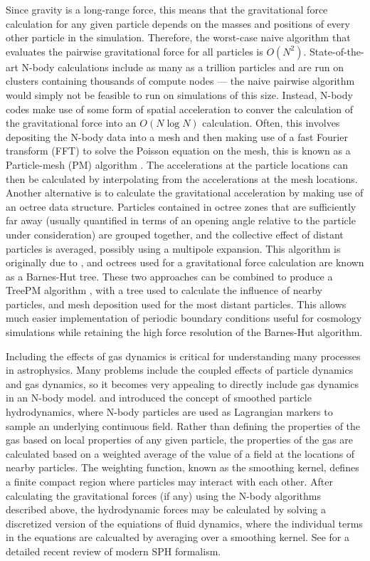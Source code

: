 \documentclass[11pt,twoside]{article}
\begin{document}
Since gravity is a long-range force, this means that the gravitational force calculation for any given particle depends on the masses and positions of every other particle in the simulation. Therefore, the worst-case naive algorithm that evaluates the pairwise gravitational force for all particles is $O(N^2)$. State-of-the-art N-body calculations include as many as a trillion particles and are run on clusters containing thousands of compute nodes --- the naive pairwise algorithm would simply not be feasible to run on simulations of this size. Instead, N-body codes make use of some form of spatial acceleration to conver the calculation of the gravitational force into an $O(N \log N)$ calculation. Often, this involves depositing the N-body data into a mesh and then making use of a fast Fourier transform (FFT) to solve the Poisson equation on the mesh, this is known as a Particle-mesh (PM) algorithm \citep{hockney1988}. The accelerations at the particle locations can then be calculated by interpolating from the accelerations at the mesh locations. Another alternative is to calculate the gravitational acceleration by making use of an octree data structure. Particles contained in octree zones that are sufficiently far away (usually quantified in terms of an opening angle relative to the particle under consideration) are grouped together, and the collective effect of distant particles is averaged, possibly using a multipole expansion. This algorithm is originally due to \citet{barnes1986}, and octrees used for a gravitational force calculation are known as a Barnes-Hut tree. These two approaches can be combined to produce a TreePM algorithm \citep{bagla2002}, with a tree used to calculate the influence of nearby particles, and mesh deposition used for the most distant particles. This allows much easier implementation of periodic boundary conditions useful for cosmology simulations while retaining the high force resolution of the Barnes-Hut algorithm.

Including the effects of gas dynamics is critical for understanding many processes in astrophysics. Many problems include the coupled effects of particle dynamics and gas dynamics, so it becomes very appealing to directly include gas dynamics in an N-body model. \citet{lucy1977} and \citet{gingold1977} introduced the concept of smoothed particle hydrodynamics, where N-body particles are used as Lagrangian markers to sample an underlying continuous field. Rather than defining the properties of the gas based on local properties of any given particle, the properties of the gas are calculated based on a weighted average of the value of a field at the locations of nearby particles. The weighting function, known as the smoothing kernel, defines a finite compact region where particles may interact with each other. After calculating the gravitational forces (if any) using the N-body algorithms described above, the hydrodynamic forces may be calculated by solving a discretized version of the equiations of fluid dynamics, where the individual terms in the equations are calcualted by averaging over a smoothing kernel. See \citet{price2012} for a detailed recent review of modern SPH formalism.
\end{document}
